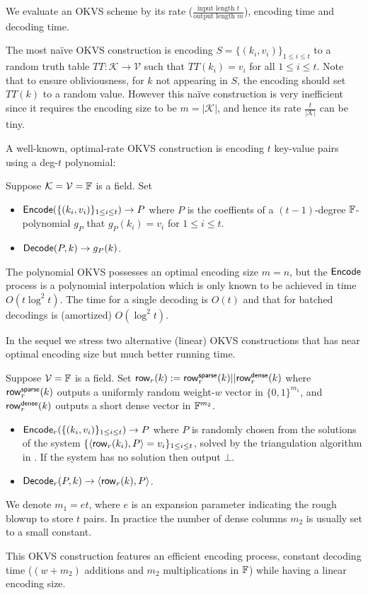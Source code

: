 We evaluate an OKVS scheme by its rate ($\frac{\text{input length }t}{\text{output length }m}$), encoding time and decoding time. 

The most na\"ive OKVS construction is encoding $S = \{(k_i, v_i)\}_{1\le i\le t}$ to a random truth table $TT:\mathcal{K}\rightarrow \mathcal{V}$ such that $TT(k_i) = v_i$ for all $1\le i\le t$. Note that to ensure obliviousness, for $k$ not appearing in $S$, the encoding should set $TT(k)$ to a random value. However this na\"ive construction is very inefficient since it requires the encoding size to be $m=|\mathcal{K}|$, and hence its rate $\frac{t}{|\mathcal{K}|}$ can be tiny. 

A well-known, optimal-rate OKVS construction is encoding $t$ key-value pairs using a deg-$t$ polynomial: 
\begin{construction}[Polynomial]\label{con:OKVS_polynomial}
  Suppose $\mathcal{K} = \mathcal{V}=\mathbb{F}$ is a field. Set 
  \begin{itemize}
    \item ${\sf Encode}(\{(k_i,v_i)\}_{1\le i\le t}) \rightarrow P$ where $P$ is the coeffients of a $(t-1)$-degree $\mathbb{F}$-polynomial $g_P$ that $g_P(k_i) = v_i$ for $1\le i\le t$. 
    \item ${\sf Decode}(P,k)\rightarrow g_P(k)$. 
  \end{itemize}
\end{construction}
The polynomial OKVS possesses an optimal encoding size $m=n$, but the ${\sf Encode}$ process is a polynomial interpolation which is only known to be achieved in time $O(t\log^2t)$. The time for a single decoding is $O(t)$ and that for batched decodings is (amortized) $O(\log^2 t)$. 

In the sequel we stress two alternative (linear) OKVS constructions that has near optimal encoding size but much better running time. 

\begin{construction}\label{con:OKVS_sparse_matrix}
  Suppose $\mathcal{V}=\mathbb{F}$ is a field. Set ${\sf row}_r(k):={\sf row}_r^{\sf sparse}(k)||{\sf row}_r^{\sf dense}(k)$ where ${\sf row}_r^{\sf sparse}(k)$ outputs a uniformly random weight-$w$ vector in $\{0,1\}^{m_1}$, and ${\sf row}_r^{\sf dense}(k)$ outputs a short dense vector in $\mathbb{F}^{m_2}$. 
  \begin{itemize}
    \item ${\sf Encode}_r(\{(k_i,v_i)\}_{1\le i\le t}) \rightarrow P$ where $P$ is randomly chosen from the solutions of the system $\{\langle {\sf row}_r(k_i), P \rangle = v_i\}_{1\le i\le t}$, solved by the triangulation algorithm in \cite{cryptoeprint:2022/320}. If the system has no solution then output $\bot$. 
    \item ${\sf Decode}_r(P,k)\rightarrow \langle {\sf row}_r(k), P \rangle$. 
  \end{itemize}
  We denote $m_1=et$, where $e$ is an expansion parameter indicating the rough blowup to store $t$ pairs. In practice the number of dense columns $m_2$ is usually set to a small constant. 
\end{construction}
This OKVS construction features an efficient encoding process, constant decoding time ($(w+m_2)$ additions and $m_2$ multiplications in $\mathbb{F}$) while having a linear encoding size. 

